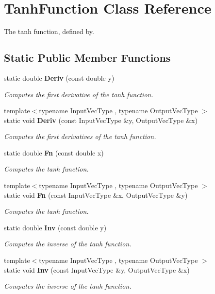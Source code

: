 \section{Tanh\+Function Class Reference}
\label{classmlpack_1_1ann_1_1TanhFunction}


The tanh function, defined by.  


\subsection*{Static Public Member Functions}
\begin{DoxyCompactItemize}
\item 
static double \textbf{ Deriv} (const double y)
\begin{DoxyCompactList}\small\item\em Computes the first derivative of the tanh function. \end{DoxyCompactList}\item 
{\footnotesize template$<$typename Input\+Vec\+Type , typename Output\+Vec\+Type $>$ }\\static void \textbf{ Deriv} (const Input\+Vec\+Type \&y, Output\+Vec\+Type \&x)
\begin{DoxyCompactList}\small\item\em Computes the first derivatives of the tanh function. \end{DoxyCompactList}\item 
static double \textbf{ Fn} (const double x)
\begin{DoxyCompactList}\small\item\em Computes the tanh function. \end{DoxyCompactList}\item 
{\footnotesize template$<$typename Input\+Vec\+Type , typename Output\+Vec\+Type $>$ }\\static void \textbf{ Fn} (const Input\+Vec\+Type \&x, Output\+Vec\+Type \&y)
\begin{DoxyCompactList}\small\item\em Computes the tanh function. \end{DoxyCompactList}\item 
static double \textbf{ Inv} (const double y)
\begin{DoxyCompactList}\small\item\em Computes the inverse of the tanh function. \end{DoxyCompactList}\item 
{\footnotesize template$<$typename Input\+Vec\+Type , typename Output\+Vec\+Type $>$ }\\static void \textbf{ Inv} (const Input\+Vec\+Type \&y, Output\+Vec\+Type \&x)
\begin{DoxyCompactList}\small\item\em Computes the inverse of the tanh function. \end{DoxyCompactList}\end{DoxyCompactItemize}


